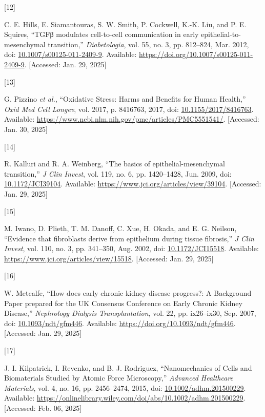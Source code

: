 \documentclass[
  paper=a4,
  ,captions=tableheading
]{scrartcl}
\newlength{\cslhangindent}
\newlength{\csllabelwidth}
\newenvironment{CSLReferences}[2] %
  {\begin{list}{}{%
   \setlength{\itemindent}{0pt}
   \setlength{\leftmargin}{0pt}
   \setlength{\parsep}{0pt}
   \ifodd #1
    \setlength{\leftmargin}{\cslhangindent}
    \setlength{\itemindent}{-1\cslhangindent}
   \fi
   \setlength{\itemsep}{#2\baselineskip}}}
  {\end{list}}
\newcommand{\CSLLeftMargin}[1]{\parbox[t]{\csllabelwidth}{\strut#1\strut}}
\newcommand{\CSLRightInline}[1]{\parbox[t]{\linewidth - \csllabelwidth}{\strut#1\strut}}
\begin{document}
\begin{CSLReferences}{0}{0}
\CSLLeftMargin{{[}12{]} }%
\CSLRightInline{C. E. Hills, E. Siamantouras, S. W. Smith, P. Cockwell,
K.-K. Liu, and P. E. Squires, {``{TGFβ} modulates cell-to-cell
communication in early epithelial-to-mesenchymal transition,''}
\emph{Diabetologia}, vol. 55, no. 3, pp. 812--824, Mar. 2012, doi:
\href{https://doi.org/10.1007/s00125-011-2409-9}{10.1007/s00125-011-2409-9}.
Available: \url{https://doi.org/10.1007/s00125-011-2409-9}. {[}Accessed:
Jan. 29, 2025{]}}

\CSLLeftMargin{{[}13{]} }%
\CSLRightInline{G. Pizzino \emph{et al.}, {``Oxidative {Stress}: {Harms}
and {Benefits} for {Human Health},''} \emph{Oxid Med Cell Longev}, vol.
2017, p. 8416763, 2017, doi:
\href{https://doi.org/10.1155/2017/8416763}{10.1155/2017/8416763}.
Available: \url{https://www.ncbi.nlm.nih.gov/pmc/articles/PMC5551541/}.
{[}Accessed: Jan. 30, 2025{]}}

\CSLLeftMargin{{[}14{]} }%
\CSLRightInline{R. Kalluri and R. A. Weinberg, {``The basics of
epithelial-mesenchymal transition,''} \emph{J Clin Invest}, vol. 119,
no. 6, pp. 1420--1428, Jun. 2009, doi:
\href{https://doi.org/10.1172/JCI39104}{10.1172/JCI39104}. Available:
\url{https://www.jci.org/articles/view/39104}. {[}Accessed: Jan. 29,
2025{]}}

\CSLLeftMargin{{[}15{]} }%
\CSLRightInline{M. Iwano, D. Plieth, T. M. Danoff, C. Xue, H. Okada, and
E. G. Neilson, {``Evidence that fibroblasts derive from epithelium
during tissue fibrosis,''} \emph{J Clin Invest}, vol. 110, no. 3, pp.
341--350, Aug. 2002, doi:
\href{https://doi.org/10.1172/JCI15518}{10.1172/JCI15518}. Available:
\url{https://www.jci.org/articles/view/15518}. {[}Accessed: Jan. 29,
2025{]}}

\CSLLeftMargin{{[}16{]} }%
\CSLRightInline{W. Metcalfe, {``How does early chronic kidney disease
progress?: {A Background Paper} prepared for the {UK Consensus
Conference} on {Early Chronic Kidney Disease},''} \emph{Nephrology
Dialysis Transplantation}, vol. 22, pp. ix26--ix30, Sep. 2007, doi:
\href{https://doi.org/10.1093/ndt/gfm446}{10.1093/ndt/gfm446}.
Available: \url{https://doi.org/10.1093/ndt/gfm446}. {[}Accessed: Jan.
29, 2025{]}}

\CSLLeftMargin{{[}17{]} }%
\CSLRightInline{J. I. Kilpatrick, I. Revenko, and B. J. Rodriguez,
{``Nanomechanics of {Cells} and {Biomaterials Studied} by {Atomic Force
Microscopy},''} \emph{Advanced Healthcare Materials}, vol. 4, no. 16,
pp. 2456--2474, 2015, doi:
\href{https://doi.org/10.1002/adhm.201500229}{10.1002/adhm.201500229}.
Available:
\url{https://onlinelibrary.wiley.com/doi/abs/10.1002/adhm.201500229}.
{[}Accessed: Feb. 06, 2025{]}}


\end{CSLReferences}
\end{document}
